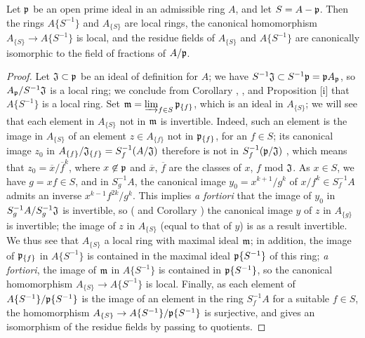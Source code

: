 \begin{prop}[7.6.17]
\label{0.7.6.17}
Let $\mathfrak{p}$ be an open prime ideal in an admissible ring $A$, and let $S=A-\mathfrak{p}$.
Then the rings $A\{S^{-1}\}$ and $A_{\{S\}}$ are local rings, the canonical homomorphism
$A_{\{S\}}\to A\{S^{-1}\}$ is local, and the residue fields of $A_{\{S\}}$ and $A\{S^{-1}\}$ are
canonically isomorphic to the field of fractions of $A/\mathfrak{p}$.
\end{prop}

\begin{proof}
\label{proof-0.7.6.17}
Let $\mathfrak{J}\subset\mathfrak{p}$ be an ideal of definition for $A$; we have
$S^{-1}\mathfrak{J}\subset S^{-1}\mathfrak{p}=\mathfrak{p}A_\mathfrak{p}$, so
$A_\mathfrak{p}/S^{-1}\mathfrak{J}$ is a local ring; we conclude from 
Corollary , , and
Proposition [i] that $A\{S^{-1}\}$ is a local ring. Set
$\mathfrak{m}=\varinjlim_{f\in S}\mathfrak{p}_{\{f\}}$, which is an ideal in $A_{\{S\}}$; we
will see that each element in $A_{\{S\}}$ not in $\mathfrak{m}$ is invertible. Indeed, such an
element is the image in $A_{\{S\}}$ of an element $z\in A_{\{f\}}$ not in $\mathfrak{p}_{\{f\}}$,
for an $f\in S$; its canonical image $z_0$ in
$A_{\{f\}}/\mathfrak{J}_{\{f\}}=S_f^{-1}(A/\mathfrak{J})$ therefore is not in
$S_f^{-1}(\mathfrak{p}/\mathfrak{J})$ , which means that
$z_0=\overline{x}/\overline{f}^k$, where $x\not\in\mathfrak{p}$ and $\overline{x}$, $\overline{f}$
are the classes of $x$, $f$ mod $\mathfrak{J}$. As $x\in S$, we have $g=xf\in S$, and in
$S_g^{-1}A$, the canonical image $y_0=x^{k+1}/g^k$ of $x/f^k\in S_f^{-1}A$ admits an inverse
$x^{k-1}f^{2k}/g^k$. This implies \emph{a fortiori} that the image of $y_0$ in
$S_g^{-1}A/S_g^{-1}\mathfrak{J}$ is invertible, so ( and
Corollary ) the canonical image $y$ of $z$ in $A_{\{g\}}$ is
invertible; the image of $z$ in $A_{\{S\}}$ (equal to that of $y$) is as a result invertible.
We thus see that $A_{\{S\}}$ a local ring with maximal ideal $\mathfrak{m}$; in addition, the image
of $\mathfrak{p}_{\{f\}}$ in $A\{S^{-1}\}$ is contained in the maximal ideal $\mathfrak{p}\{S^{-1}\}$
of this ring; \emph{a fortiori}, the image of $\mathfrak{m}$ in $A\{S^{-1}\}$ is contained in
$\mathfrak{p}\{S^{-1}\}$, so the canonical homomorphism $A_{\{S\}}\to A\{S^{-1}\}$ is local. Finally,
as each element of $A\{S^{-1}\}/\mathfrak{p}\{S^{-1}\}$ is the image of an element in the ring
$S_f^{-1}A$ for a suitable $f\in S$, the homomorphism $A_{\{S\}}\to A\{S^{-1}\}/\mathfrak{p}\{S^{-1}\}$
is surjective, and gives an isomorphism of the residue fields by passing to quotients.
\end{proof}

